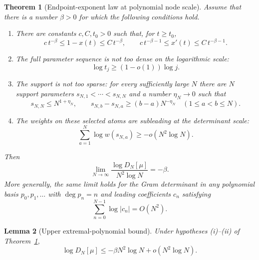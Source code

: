 \documentclass[preprint,12pt]{elsarticle}
\numberwithin{equation}{section}
\theoremstyle{plain}
\newtheorem{theorem}{Theorem}[section]
\newtheorem{lemma}[theorem]{Lemma}
\theoremstyle{definition}
\theoremstyle{remark}
\begin{document}
\begin{theorem}[Endpoint-exponent law at polynomial node scale]
\label{thm:endpoint_exponent_law}
Assume that there is a number $\beta>0$ for which the following conditions hold.
\begin{enumerate}[label=(\roman*)]
\item There are constants $c,C,t_0>0$ such that, for $t\ge t_0$,
\begin{equation}
c\,t^{-\beta}\le1-x(t)\le C\,t^{-\beta},
\qquad
c\,t^{-\beta-1}\le x'(t)\le C\,t^{-\beta-1}.
\label{eq:endpoint_power_law}
\end{equation}
\item The full parameter sequence is not too dense on the logarithmic scale:
\begin{equation}
\log t_j\ge (1-o(1))\log j.
\label{eq:abstract_node_lower_scale}
\end{equation}
\item The support is not too sparse: for every sufficiently large $N$ there are $N$ support parameters
$s_{N,1}<\cdots<s_{N,N}$ and a number $\eta_N\to0$ such that
\begin{equation}
s_{N,N}\le N^{1+\eta_N},
\qquad
s_{N,b}-s_{N,a}\ge(b-a)N^{-\eta_N}
\quad(1\le a<b\le N).
\label{eq:abstract_separated_configuration}
\end{equation}
\item The weights on these selected atoms are subleading at the determinant scale:
\begin{equation}
\sum_{a=1}^N \log w(s_{N,a})
\ge-o(N^2\log N).
\label{eq:abstract_weight_condition}
\end{equation}
\end{enumerate}
Then
\begin{equation}
\boxed{
\lim_{N\to\infty}
\frac{\log D_N[\mu]}{N^2\log N}
=-\beta.}
\label{eq:endpoint_exponent_limit}
\end{equation}
More generally, the same limit holds for the Gram determinant in any polynomial basis $p_0,p_1,\ldots$ with $\deg p_n=n$ and leading coefficients $c_n$ satisfying
\begin{equation}
\sum_{n=0}^{N-1}\log|c_n|=O(N^2).
\label{eq:basis_subleading_condition}
\end{equation}
\end{theorem}

\begin{lemma}[Upper extremal-polynomial bound]
\label{lem:endpoint_upper_module}
Under hypotheses \textup{(i)}--\textup{(ii)} of
Theorem~\ref{thm:endpoint_exponent_law},
\[
\log D_N[\mu]\le-\beta N^2\log N+o(N^2\log N).
\]
\end{lemma}
\end{document}
